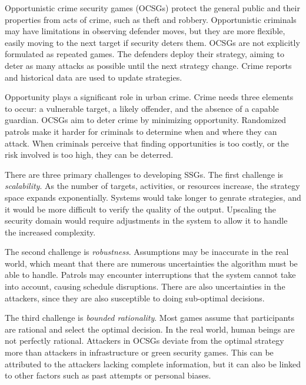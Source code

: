 \documentclass[journal]{./IEEE/IEEEtran}
\begin{document}
Opportunistic crime security games (OCSGs) protect the general public and their properties from acts of crime, such as theft and robbery.\cite{zhang2016opportunistic} Opportunistic criminals may have limitations in observing defender moves, but they are more flexible, easily moving to the next target if security deters them.\cite{zhang2016keeping} OCSGs are not explicitly formulated as repeated games. The defenders deploy their strategy, aiming to deter as many attacks as possible until the next strategy change. Crime reports and historical data are used to update strategies.\cite{an2017stackelberg}

Opportunity plays a significant role in urban crime. Crime needs three elements to occur: a vulnerable target, a likely offender, and the absence of a capable guardian.\cite{felson1998opportunity} OCSGs aim to deter crime by minimizing opportunity. Randomized patrols make it harder for criminals to determine when and where they can attack.\cite{paruchuri2007keep} When criminals perceive that finding opportunities is too costly, or the risk involved is too high, they can be deterred.\cite{felson1998opportunity}

There are three primary challenges to developing SSGs. The first challenge is \textit{scalability}. As the number of targets, activities, or resources increase, the strategy space expands exponentially. Systems would take longer to genrate strategies, and it would be more difficult to verify the quality of the output.\cite{tsai2009iris} Upscaling the security domain would require adjustments in the system to allow it to handle the increased complexity.\cite{pita2011guards}  

The second challenge is \textit{robustness}. Assumptions may be inaccurate in the real world, which meant that there are numerous uncertainties the algorithm must be able to handle.\cite{yin2013addressing} Patrols may encounter interruptions that the system cannot take into account, causing schedule disruptions. There are also uncertainties in the attackers, since they are also susceptible to doing sub-optimal decisions.\cite{pita2009effective}  

The third challenge is \textit{bounded rationality}. Most games assume that participants are rational and select the optimal decision. In the real world, human beings are not perfectly rational.\cite{abbasi2015human} Attackers in OCSGs deviate from the optimal strategy more than attackers in infrastructure or green security games. This can be attributed to the attackers lacking complete information, but it can also be linked to other factors such as past attempts or personal biases.\cite{sinha1human}
\end{document}
